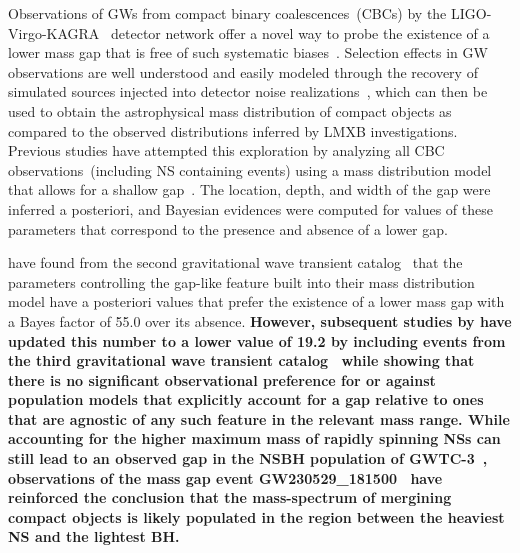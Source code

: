 \documentclass[modern]{aastex631}
\begin{document}
Observations of GWs from compact binary coalescences~(CBCs) by the LIGO-Virgo-KAGRA~\citep[LVK, ][]{LIGOScientific:2014pky, VIRGO:2014yos, KAGRA:2020agh} detector network offer a novel way to probe the existence of a lower mass gap that is free of such systematic biases~\citep{Farah:2021qom,  LIGOScientific:2024elc, KAGRA:2021duu}. Selection effects in GW observations are well understood and easily modeled through the recovery of simulated sources injected into detector noise realizations~\citep{Thrane:2018qnx,Mandel:2018mve,popgw3, Tiwari:2017ndi}, which can then be used to obtain the astrophysical mass distribution of compact objects as compared to the observed distributions inferred by LMXB investigations. Previous studies have attempted this exploration by analyzing all CBC observations~(including NS containing events) using a mass distribution model that allows for a shallow gap~\citep{Farah:2021qom,  KAGRA:2021duu, LIGOScientific:2024elc}. The location, depth, and width of the gap were inferred a posteriori, and Bayesian evidences were computed for values of these parameters that correspond to the presence and absence of a lower gap. 

\cite{Farah:2021qom} have found from the second gravitational wave transient catalog~\citep{LIGOScientific:2020ibl} that the parameters controlling the gap-like feature built into their mass distribution model have a posteriori values that prefer the existence of a lower mass gap with a Bayes factor of 55.0 over its absence. \textbf{However, subsequent studies by \cite{KAGRA:2021duu} have updated this number to a lower value of 19.2 by including events from the third gravitational wave transient catalog~\citep[GWTC-3,][]{KAGRA:2021vkt} while showing that there is no significant observational preference for or against population models that explicitly account for a gap relative to ones that are agnostic of any such feature in the relevant mass range. While accounting for the higher maximum mass of rapidly spinning NSs can still lead to an observed gap in the NSBH population of GWTC-3~\citep{Ye:2022qoe}, observations of the mass gap event GW230529\_181500~\citep[a compact binary merger whose most massive component lies in the $3-5M_{\odot}$ range][]{LIGOScientific:2024elc} have reinforced the conclusion that the mass-spectrum of mergining compact objects is likely populated in the region between the heaviest NS and the lightest BH.}
\end{document}
